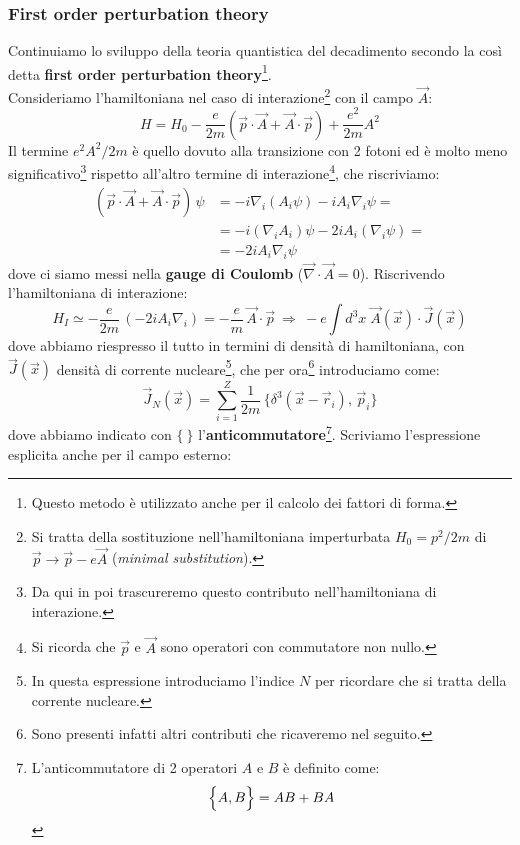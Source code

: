 \subsubsection{First order perturbation theory} Continuiamo lo sviluppo della teoria quantistica del decadimento secondo la così detta \textbf{first order perturbation theory}\footnote{Questo metodo è utilizzato anche per il calcolo dei fattori di forma.}.\\
Consideriamo l'hamiltoniana nel caso di interazione\footnote{Si tratta della sostituzione nell'hamiltoniana imperturbata $H_0 = p^2/2m$ di  $\vec{p}\to\vec{p}-e\vec{A}$ (\textit{minimal substitution}).} con il campo $\vec{A}$:
$$H = H_0 - \frac{e}{2m}(\vec{p}\cdot\vec{A}+\vec{A}\cdot\vec{p})+\frac{e^2}{2m}A^2$$
Il termine $e^2A^2/2m$ è quello dovuto alla transizione con 2 fotoni ed è molto meno significativo\footnote{Da qui in poi trascureremo questo contributo nell'hamiltoniana di interazione.} rispetto all'altro termine di interazione\footnote{Si ricorda che $\vec{p}$ e $\vec{A}$ sono operatori con commutatore non nullo.}, che riscriviamo:
\begin{displaymath}
\begin{aligned}
(\vec{p}\cdot\vec{A}+\vec{A}\cdot\vec{p}) \,\psi &= -i\nabla_i (A_i\psi) - i A_i \nabla_i \psi = \\
&= -i (\nabla_i A_i )\psi - 2i A_i (\nabla_i\psi) = \\
&= -2i A_i \nabla_i \psi
\end{aligned}
\end{displaymath}
dove ci siamo messi nella \textbf{gauge di Coulomb} ($\vec{\nabla}\cdot\vec{A}=0$). Riscrivendo l'hamiltoniana di interazione:
$$H_I \simeq - \frac{e}{2m}\,(-2iA_i\nabla_i) = -\frac{e}{m}\, \vec{A}\cdot\vec{p}\:\Rightarrow\: -e \int d^3x \; \vec{A}(\vec{x})\cdot \vec{J}(\vec{x})$$
dove abbiamo riespresso il tutto in termini di densità di hamiltoniana, con $\vec{J}(\vec{x})$ densità di corrente nucleare\footnote{In questa espressione introduciamo l'indice $N$ per ricordare che si tratta della corrente nucleare.}, che per ora\footnote{Sono presenti infatti altri contributi che ricaveremo nel seguito.} introduciamo come:
$$\vec{J}_N (\vec{x}) = \sum_{i=1}^Z \frac{1}{2m}\,\Biggl \{ \delta^3(\vec{x}-\vec{r}_i),\, \vec{p}_i \Biggr \}$$
dove abbiamo indicato con $\bigl\{\:\bigr\}$ l'\textbf{anticommutatore}\footnote{L'anticommutatore di 2 operatori $A$ e $B$ è definito come:
$$\Bigl\{A,B\Bigr\} = AB+BA$$}. Scriviamo l'espressione esplicita anche per il campo esterno:
